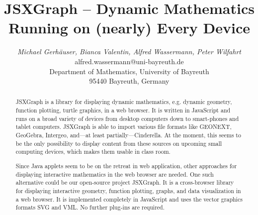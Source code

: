\documentclass[12pt,a4paper]{article}%
\begin{document}
%
%
\title{JSXGraph -- Dynamic Mathematics Running on (nearly) Every Device}%
%
%
\author{\begin{tabular}{c}
\textit{Michael Gerh\"auser, Bianca Valentin, Alfred Wassermann, Peter Wilfahrt} \\
alfred.wassermann@uni-bayreuth.de\\
Department of Mathematics, 
University of Bayreuth\\
95440 Bayreuth, 
Germany\end{tabular}
}%
%
\date{}                                                   %
\maketitle                                                %
%
%
\begin{abstract}
%
JSXGraph is a library for displaying dynamic mathematics, e.g. dynamic geometry, 
function plotting, turtle graphics, in a web browser. 
It is written in JavaScript and runs on a broad variety of devices from 
desktop computers down to smart-phones and tablet computers. 
JSXGraph is able to import various file formats like GEONEXT, GeoGebra, Intergeo, 
and---at least partially---Cinderella. 
At the moment, this seems to be the only possibility to display content from 
these sources on upcoming small computing devices, which makes them usable 
in class room.

Since Java applets seem to be on the retreat in web application, other 
approaches for displaying interactive mathematics in the web browser are needed. 
One such alternative could be our open-source project JSXGraph. It is a 
cross-browser library for displaying interactive geometry, function plotting, 
graphs, and data visualization in a web browser. It is implemented completely 
in JavaScript and uses the vector graphics formats SVG and VML. No further 
plug-ins are required.
%
\end{abstract}%
%
\end{document}
